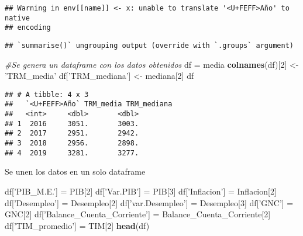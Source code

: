 \documentclass[
  11pt,
]{article}
\newenvironment{Shaded}{\begin{snugshade}}{\end{snugshade}}
\newcommand{\CommentTok}[1]{\textcolor[rgb]{0.56,0.35,0.01}{\textit{#1}}}
\newcommand{\DecValTok}[1]{\textcolor[rgb]{0.00,0.00,0.81}{#1}}
\newcommand{\KeywordTok}[1]{\textcolor[rgb]{0.13,0.29,0.53}{\textbf{#1}}}
\newcommand{\NormalTok}[1]{#1}
\newcommand{\StringTok}[1]{\textcolor[rgb]{0.31,0.60,0.02}{#1}}
\begin{document}
\begin{verbatim}
## Warning in env[[name]] <- x: unable to translate '<U+FEFF>Año' to native
## encoding
\end{verbatim}

\begin{verbatim}
## `summarise()` ungrouping output (override with `.groups` argument)
\end{verbatim}

\begin{Shaded}
\begin{Highlighting}[]
\CommentTok{#Se genera un dataframe con los datos obtenidos}
\NormalTok{df =}\StringTok{ }\NormalTok{media}
\KeywordTok{colnames}\NormalTok{(df)[}\DecValTok{2}\NormalTok{] <-}\StringTok{ 'TRM_media'}
\NormalTok{df[}\StringTok{'TRM_mediana'}\NormalTok{] <-}\StringTok{ }\NormalTok{mediana[}\DecValTok{2}\NormalTok{]}
\NormalTok{df}
\end{Highlighting}
\end{Shaded}

\begin{verbatim}
## # A tibble: 4 x 3
##   `<U+FEFF>Año` TRM_media TRM_mediana
##   <int>     <dbl>       <dbl>
## 1  2016     3051.       3003.
## 2  2017     2951.       2942.
## 3  2018     2956.       2898.
## 4  2019     3281.       3277.
\end{verbatim}

Se unen los datos en un solo dataframe

\begin{Shaded}
\begin{Highlighting}[]
\NormalTok{df[}\StringTok{'PIB_M.E.'}\NormalTok{] =}\StringTok{ }\NormalTok{PIB[}\DecValTok{2}\NormalTok{]}
\NormalTok{df[}\StringTok{'Var.PIB'}\NormalTok{] =}\StringTok{ }\NormalTok{PIB[}\DecValTok{3}\NormalTok{]}
\NormalTok{df[}\StringTok{'Inflacion'}\NormalTok{] =}\StringTok{ }\NormalTok{Inflacion[}\DecValTok{2}\NormalTok{]}
\NormalTok{df[}\StringTok{'Desempleo'}\NormalTok{] =}\StringTok{ }\NormalTok{Desempleo[}\DecValTok{2}\NormalTok{]}
\NormalTok{df[}\StringTok{'var.Desempleo'}\NormalTok{] =}\StringTok{ }\NormalTok{Desempleo[}\DecValTok{3}\NormalTok{]}
\NormalTok{df[}\StringTok{'GNC'}\NormalTok{] =}\StringTok{ }\NormalTok{GNC[}\DecValTok{2}\NormalTok{]}
\NormalTok{df[}\StringTok{'Balance_Cuenta_Corriente'}\NormalTok{] =}\StringTok{ }\NormalTok{Balance_Cuenta_Corriente[}\DecValTok{2}\NormalTok{]}
\NormalTok{df[}\StringTok{'TIM_promedio'}\NormalTok{] =}\StringTok{ }\NormalTok{TIM[}\DecValTok{2}\NormalTok{]}
\KeywordTok{head}\NormalTok{(df)}
\end{Highlighting}
\end{Shaded}
\end{document}
